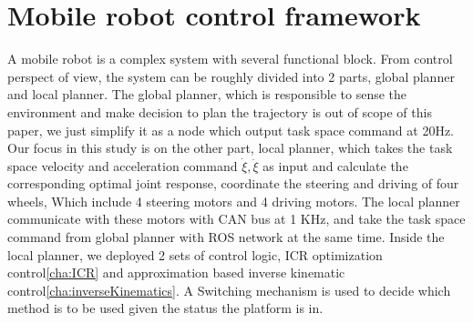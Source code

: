 \chapter{Mobile robot control framework}
\label{cha:framework}
A mobile robot is a complex system with several functional block. From control perspect of view, the system can be roughly divided into 2 parts, global planner and local planner.
The global planner, which is responsible to sense the environment and make decision to plan the trajectory is out of scope of this paper, we just simplify it as a node which  output task space command at 20Hz.
Our focus in this study is on the other part, local planner, which takes the task space velocity and acceleration command $\dot{\xi},\ddot{\xi}$ as input and calculate the corresponding optimal joint response, 
coordinate the steering and driving of four wheels, Which include 4 steering motors and 4 driving motors. 
The local planner communicate with these motors with CAN bus at 1 KHz, and take the task space command from global planner with ROS network at the same time.
Inside the local planner, we deployed 2 sets of control logic, ICR optimization control\cref{cha:ICR} and approximation based inverse kinematic control\cref{cha:inverseKinematics}. A Switching mechanism is used to decide
which method is to be used given the status the platform is in.




